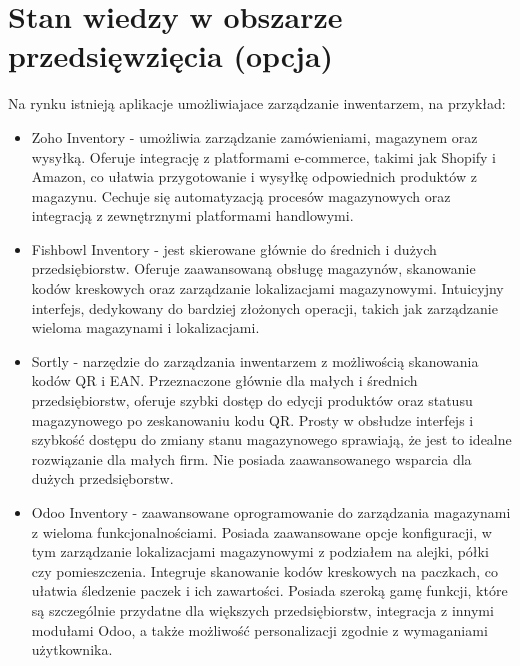 \documentclass[../main.tex]{subfiles}
\begin{document}
\section{Stan wiedzy w obszarze przedsięwzięcia (opcja)}

Na rynku istnieją aplikacje umożliwiajace zarządzanie inwentarzem, na przykład: 
\begin{itemize}
    \item Zoho Inventory - umożliwia zarządzanie zamówieniami, magazynem oraz wysyłką. Oferuje integrację z platformami e-commerce, takimi jak Shopify i Amazon, co ułatwia przygotowanie i wysyłkę odpowiednich produktów z magazynu. Cechuje się automatyzacją procesów magazynowych oraz integracją z zewnętrznymi platformami handlowymi.
    \item Fishbowl Inventory - jest skierowane głównie do średnich i dużych przedsiębiorstw. Oferuje zaawansowaną obsługę magazynów, skanowanie kodów kreskowych oraz zarządzanie lokalizacjami magazynowymi. Intuicyjny interfejs, dedykowany do bardziej złożonych operacji, takich jak zarządzanie wieloma magazynami i lokalizacjami.
    \item Sortly - narzędzie do zarządzania inwentarzem z możliwością skanowania kodów QR i EAN. Przeznaczone głównie dla małych i średnich przedsiębiorstw, oferuje szybki dostęp do edycji produktów oraz statusu magazynowego po zeskanowaniu kodu QR. Prosty w obsłudze interfejs i szybkość dostępu do zmiany stanu magazynowego sprawiają, że jest to idealne rozwiązanie dla małych firm. Nie posiada zaawansowanego wsparcia dla dużych przedsięborstw.
    \item Odoo Inventory - zaawansowane oprogramowanie do zarządzania magazynami z wieloma funkcjonalnościami. Posiada zaawansowane opcje konfiguracji, w tym zarządzanie lokalizacjami magazynowymi z podziałem na alejki, półki czy pomieszczenia. Integruje skanowanie kodów kreskowych na paczkach, co ułatwia śledzenie paczek i ich zawartości. Posiada szeroką gamę funkcji, które są szczególnie przydatne dla większych przedsiębiorstw, integracja z innymi modułami Odoo, a także możliwość personalizacji zgodnie z wymaganiami użytkownika.
\end{itemize}
\end{document}
